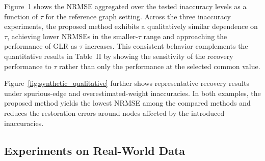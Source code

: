 Figure~1 shows the NRMSE aggregated over the tested inaccuracy levels as a function of $\tau$ for the reference graph setting.
Across the three inaccuracy experiments, the proposed method exhibits a qualitatively similar dependence on $\tau$, achieving lower NRMSEs in the smaller-$\tau$ range and approaching the performance of GLR as $\tau$ increases.
This consistent behavior complements the quantitative results in Table~II by showing the sensitivity of the recovery performance to $\tau$ rather than only the performance at the selected common value.

Figure~\ref{fig:synthetic_qualitative} further shows representative recovery results under spurious-edge and overestimated-weight inaccuracies.
In both examples, the proposed method yields the lowest NRMSE among the compared methods and reduces the restoration errors around nodes affected by the introduced inaccuracies.


\subsection{Experiments on Real-World Data}

